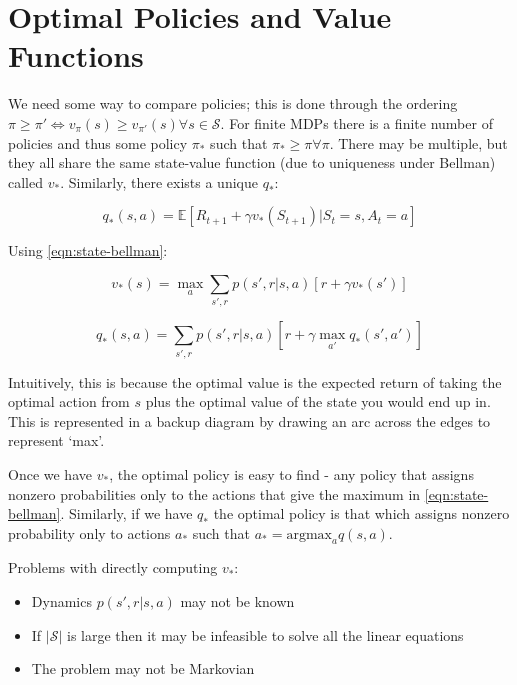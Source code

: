 \documentclass[11pt]{report}
\begin{document}
\section{Optimal Policies and Value Functions}
We need some way to compare policies; this is done through the ordering $\pi \geq \pi' \iff v_\pi(s) \geq v_{\pi'}(s) \forall s \in \mathcal{S}$. For finite MDPs there is a finite number of policies and thus some policy $\pi_*$ such that $\pi_* \geq \pi \forall \pi$. There may be multiple, but they all share the same state-value function (due to uniqueness under Bellman) called $v_*$. Similarly, there exists a unique $q_*$:

\begin{equation}
	\label{eqn:optimal-q}
	q_*(s,a) = \mathbb{E}[R_{t+1} + \gamma v_*(S_{t+1}) | S_t = s, A_t = a]
\end{equation}

Using \autoref{eqn:state-bellman}:

\begin{equation}
	\label{eqn:optimal-v-bellman}
	v_*(s) = \max_{a} \sum_{s',r} p(s',r|s,a) \left[r+\gamma v_*(s')\right]
\end{equation}


\begin{equation}
	\label{eqn:optimal-q-bellman}
	q_*(s,a) = \sum_{s',r} p(s',r|s,a) \left[r+\gamma\max_{a'}q_*(s',a')\right]
\end{equation}

Intuitively, this is because the optimal value is the expected return of taking the optimal action from $s$ plus the optimal value of the state you would end up in. This is represented in a backup diagram by drawing an arc across the edges to represent `max'.

Once we have $v_*$, the optimal policy is easy to find - any policy that assigns nonzero probabilities only to the actions that give the maximum in \autoref{eqn:state-bellman}. Similarly, if we have $q_*$ the optimal policy is that which assigns nonzero probability only to actions $a_*$ such that $a_* = \text{argmax}_{a}q(s,a)$.

Problems with directly computing $v_*$:

\begin{itemize}
	\item Dynamics $p(s',r | s,a)$ may not be known
	\item If $|\mathcal{S}|$ is large then it may be infeasible to solve all the linear equations
	\item The problem may not be Markovian
\end{itemize}
\end{document}
